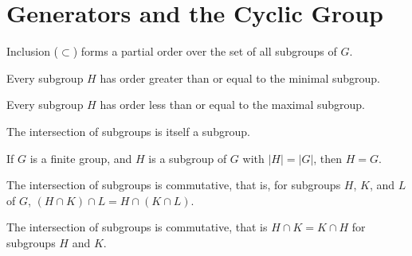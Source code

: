 \section{Generators and the Cyclic Group}

\begin{theorem}
    \label{theorem : subgroupOrder}
    \leanok
    Inclusion ($\subset$) forms a partial order over the set of all subgroups of $G$.
\end{theorem}

\begin{theorem}
    \label{theorem : Minimal_smallest}
    \leanok
    Every subgroup $H$ has order greater than or equal to the minimal subgroup.
\end{theorem}

\begin{theorem}
    \label{theorem : Maximal_largest}
    \leanok
    Every subgroup $H$ has order less than or equal to the maximal subgroup.
\end{theorem}

\begin{theorem}
    \label{definition : Intersect}
    \leanok
    The intersection of subgroups is itself a subgroup.
\end{theorem}

\begin{theorem}
    \label{definition : subgroup_eq_Maximal_of_card_eq_G}
    If $G$ is a finite group, and $H$ is a subgroup of $G$ with $|H| = |G|$, then $H = G$.
\end{theorem}

\begin{theorem}
    \label{theorem : inter_assoc}
    \leanok
    The intersection of subgroups is commutative, that is, for subgroups $H$, $K$, and $L$ of $G$,
    $(H \cap K) \cap L = H \cap (K \cap L)$.
\end{theorem}

\begin{theorem}
    \label{theorem : inter_comm}
    \leanok
    The intersection of subgroups is commutative, that is $H \cap K = K \cap H$ for subgroups $H$ and $K$.
\end{theorem}

